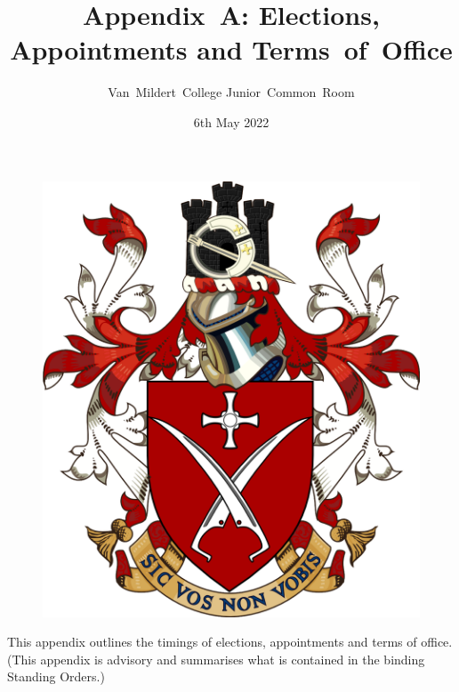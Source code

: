 \documentclass[12pt]{article}
\title{Appendix~A: Elections, Appointments and Terms~of~Office}
\author{Van~Mildert~College Junior~Common~Room}
\date{6th May 2022}
\begin{document}
    \begin{titlepage}  %
        \maketitle
        \begin{figure}[h]
            \includegraphics[scale=0.25]{arms}  %
            \centering
        \end{figure}
        \thispagestyle{empty}
    \end{titlepage}
    \setcounter{page}{2}  %

    This appendix outlines the timings of elections, appointments and terms of office.\\
    (This appendix is advisory and summarises what is contained in the binding Standing Orders.)
\end{document}

